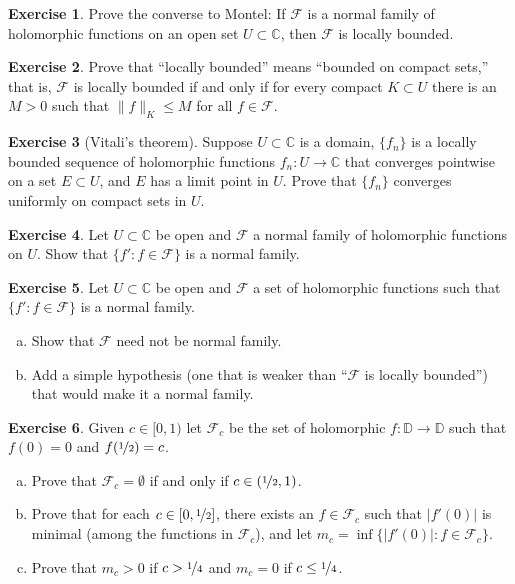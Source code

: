\documentclass[12pt,openany]{book}
\newcommand{\sabs}[1]{\lvert {#1} \rvert}
\newcommand{\snorm}[1]{\lVert {#1} \rVert}
\newcommand{\C}{{\mathbb{C}}}
\newcommand{\D}{{\mathbb{D}}}
\newcommand{\sF}{{\mathscr{F}}}
\newcommand{\myquote}[1]{``#1''}
\theoremstyle{plain}
\theoremstyle{remark}
\theoremstyle{definition}
\newenvironment{exbox}{%
    \def\FrameCommand{\vrule width 1pt \relax\hspace{10pt}}%
    \MakeFramed{\advance\hsize-\width\FrameRestore}%
}{%
    \endMakeFramed
}
\newenvironment{exparts}{%
    \leavevmode\begin{enumerate}[a),noitemsep,topsep=0pt,parsep=0pt,partopsep=0pt]
}{%
    \end{enumerate}
}
\theoremstyle{exercise}
\newtheorem{exercise}{Exercise}[section]
\theoremstyle{example}
\begin{document}
\begin{exbox}
\begin{exercise}
Prove the converse to Montel:
If $\sF$ is a normal family of holomorphic functions on an open set $U \subset \C$,
then $\sF$ is locally bounded.
\end{exercise}

\begin{exercise}
Prove that \myquote{locally bounded} means \myquote{bounded on compact sets,}
that is, $\sF$ is locally bounded if and only if
for every compact $K \subset U$ there is an $M >0$ such that
$\snorm{f}_K \leq M$ for all $f \in \sF$.
\end{exercise}

\begin{exercise}[Vitali's theorem]
Suppose $U \subset \C$ is a domain, $\{ f_n \}$ is a locally bounded
sequence of holomorphic functions $f_n \colon U \to \C$ that
converges pointwise on a set $E \subset U$,
and $E$ has a limit point in $U$.  Prove that $\{ f_n \}$
converges uniformly on compact sets in $U$.
\end{exercise}

\begin{exercise}
Let $U \subset \C$ be open and $\sF$ a normal family of
holomorphic functions on $U$.
Show that $\{ f' : f \in \sF \}$ is a normal family.
\end{exercise}

\begin{exercise}
Let $U \subset \C$ be open and $\sF$ a set of holomorphic
functions such that $\{ f' : f \in \sF \}$ is a normal family.
\begin{exparts}
\item
Show that $\sF$ need not be normal family.
\item
Add a simple
hypothesis (one that is weaker than \myquote{$\sF$ is locally bounded})
that would make it a normal family.
\end{exparts}
\end{exercise}

\begin{exercise}
Given $c \in [0,1)$ let $\sF_c$ be the set of holomorphic
$f \colon \D \to \D$ such that $f(0) = 0$ and $f(\nicefrac{1}{2}) = c$.
\begin{exparts}
\item
Prove that $\sF_c = \emptyset$ if and only if $c \in
(\nicefrac{1}{2},1)$.
\item
Prove that for each $c \in [0,\nicefrac{1}{2}]$, there exists an
$f \in \sF_c$
such that $\sabs{f'(0)}$ is minimal (among the functions in $\sF_c$),
and let $m_c = \inf \bigl\{ \sabs{f'(0)} : f \in \sF_c \bigr\}$.
\item
Prove that $m_c > 0$ if $c > \nicefrac{1}{4}$ and $m_c = 0$ if $c \leq \nicefrac{1}{4}$.
\end{exparts}
\end{exercise}


\end{exbox}
\end{document}
